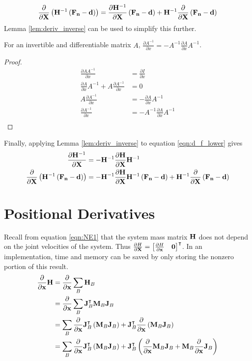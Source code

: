 \begin{align} \label{eqn:d_f_lower}
    \frac{\partial}{\partial \mathbf{X}} \left ({\mathbf{H}}^{-1}\left ({\mathbf{F_n}} - {\mathbf{d}} \right ) \right ) = 
    \frac{\partial{\mathbf{H}}^{-1}}{\partial \mathbf{X}} \left ({\mathbf{F_n}} - {\mathbf{d}} \right ) +  {\mathbf{H}}^{-1}  \frac{\partial}{\partial \mathbf{X}} \left ({\mathbf{F_n}} - {\mathbf{d}} \right )
\end{align} 
\noindent Lemma \ref{lem:deriv_inverse} can be used to simplify this further. 
\begin{lemma} \label{lem:deriv_inverse}
For an invertible and differentiable matrix $A$, $\frac{\partial A^{-1}}{\partial x} = - A^{-1}\frac{\partial A}{\partial x} A^{-1}$.
\begin{proof} 
\begin{align*}
\frac{\partial AA^{-1}}{\partial x} &= \frac{\partial I}{\partial x} \\
\frac{\partial A}{\partial x} A^{-1} + A \frac{\partial A^{-1}}{\partial x} &= 0 \\
A \frac{\partial A^{-1}}{\partial x} &= - \frac{\partial A}{\partial x} A^{-1}  \\
 \frac{\partial A^{-1}}{\partial x} &= - A^{-1}\frac{\partial A}{\partial x} A^{-1}  \\
\end{align*}
\end{proof}
\end{lemma}
\noindent Finally, applying Lemma \ref{lem:deriv_inverse} to equation \ref{eqn:d_f_lower} gives
\begin{align*}
    \frac{\partial{\mathbf{H}}^{-1}}{\partial \mathbf{X}}  &= -{\mathbf{H}}^{-1} \frac{\partial{\mathbf{H}} }{\partial \mathbf{X}} {\mathbf{H}}^{-1} \\
    \frac{\partial}{\partial \mathbf{X}} \left ({\mathbf{H}}^{-1}\left ({\mathbf{F_n}} - {\mathbf{d}} \right ) \right ) &=
    -{\mathbf{H}}^{-1} \frac{\partial{\mathbf{H}}}{\partial \mathbf{X}}{\mathbf{H}}^{-1} \left ({\mathbf{F_n}} - {\mathbf{d}} \right ) + {\mathbf{H}}^{-1}  \frac{\partial}{\partial \mathbf{X}} \left ({\mathbf{F_n}} - {\mathbf{d}} \right )
\end{align*}

\section{Positional Derivatives}
\noindent Recall from equation \ref{eqn:NE1} that the system mass matrix ${\mathbf{H}}$ does not depend on the joint velocities of the system. Thus $\frac{\partial H}{\partial\mathbf{X}} = \begin{bmatrix}
\frac{\partial H}{\partial{\mathbf{{x}}}} & {\mathbf{0}}
\end{bmatrix}^\intercal$. In an implementation, time and memory can be saved by only storing the nonzero portion of this result.
\begin{align*}
    \frac{\partial}{\partial {\mathbf{{x}}}} {\mathbf{H}} 
    &= \frac{\partial}{\partial {\mathbf{{x}}}} \sum_B {\mathbf{H}}_B \\
    &= \frac{\partial}{\partial {\mathbf{{x}}}} \sum_B \mathbf{J}_B^\intercal\mathbf{M}_B\mathbf{J}_B \\
    &= \sum_B \frac{\partial}{\partial {\mathbf{{x}}}} \mathbf{J}_B^\intercal \left(\mathbf{M}_B\mathbf{J}_B\right) + \mathbf{J}_B^\intercal \frac{\partial}{\partial {\mathbf{{x}}}} \left(\mathbf{M}_B\mathbf{J}_B\right) \\
    &= \sum_B \frac{\partial}{\partial {\mathbf{{x}}}} \mathbf{J}_B^\intercal \left(\mathbf{M}_B\mathbf{J}_B\right) + \mathbf{J}_B^\intercal  \left(\frac{\partial}{\partial {\mathbf{{x}}}}\mathbf{M}_B\mathbf{J}_B + \mathbf{M}_B\frac{\partial}{\partial {\mathbf{{x}}}}\mathbf{J}_B\right) \\
\end{align*}
